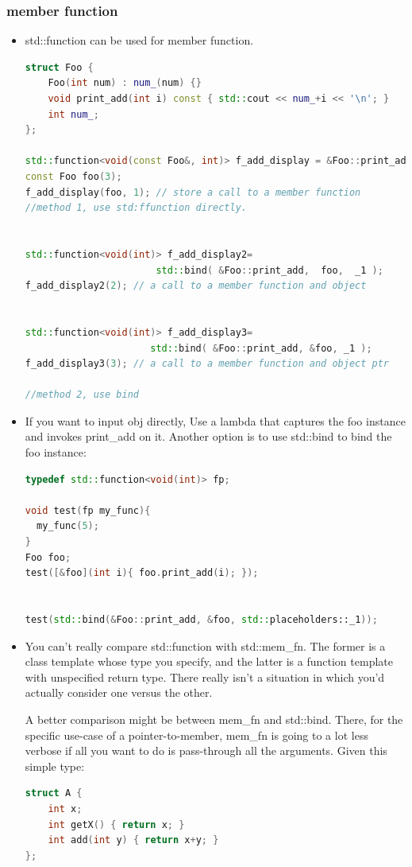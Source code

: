 \documentclass[a4paper,12pt,twoside]{book}
\begin{document}
\subsubsection{member function}
\begin{itemize}

\item std::function can be used for member function.

\begin{lstlisting}[frame=single, language=c++]
struct Foo {
    Foo(int num) : num_(num) {}
    void print_add(int i) const { std::cout << num_+i << '\n'; }
    int num_;
};

std::function<void(const Foo&, int)> f_add_display = &Foo::print_add;
const Foo foo(3);
f_add_display(foo, 1); // store a call to a member function
//method 1, use std:ffunction directly.


std::function<void(int)> f_add_display2=
                       std::bind( &Foo::print_add,  foo,  _1 );
f_add_display2(2); // a call to a member function and object


std::function<void(int)> f_add_display3=
                      std::bind( &Foo::print_add, &foo, _1 );
f_add_display3(3); // a call to a member function and object ptr

//method 2, use bind

\end{lstlisting}

\item If you want to input obj directly, Use a lambda that captures the foo instance and invokes print\_add on it. Another option is to use std::bind to bind the foo instance:

\begin{lstlisting}[frame=single, language=c++]
typedef std::function<void(int)> fp;

void test(fp my_func){
  my_func(5);
}
Foo foo;
test([&foo](int i){ foo.print_add(i); });


test(std::bind(&Foo::print_add, &foo, std::placeholders::_1));
\end{lstlisting}

\item You can't really compare std::function with std::mem\_fn. The former is a class template whose type you specify, and the latter is a function template with unspecified return type. There really isn't a situation in which you'd actually consider one versus the other.

A better comparison might be between mem\_fn and std::bind. There, for the specific use-case of a pointer-to-member, mem\_fn is going to a lot less verbose if all you want to do is pass-through all the arguments. Given this simple type:
\begin{lstlisting}[frame=single, language=c++]
struct A { 
    int x;
    int getX() { return x; }
    int add(int y) { return x+y; }
};


\end{lstlisting}
\end{itemize}
\end{document}
